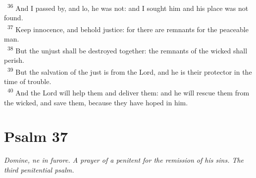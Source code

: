 \documentclass[a5paper,12pt]{article}
\begin{document}
\begin{multicols*}{2}
~\textsuperscript{36} And I passed by, and lo, he was not: and I sought him and his place was not found.\\
~\textsuperscript{37} Keep innocence, and behold justice: for there are remnants for the peaceable man.\\
~\textsuperscript{38} But the unjust shall be destroyed together: the remnants of the wicked shall perish.\\
~\textsuperscript{39} But the salvation of the just is from the Lord, and he is their protector in the time of trouble.\\
~\textsuperscript{40} And the Lord will help them and deliver them: and he will rescue them from the wicked, and save them, because they have hoped in him.\\

\section{Psalm 37}
\label{sec:orge299369}
\emph{Domine, ne in furore. A prayer of a penitent for the remission of his sins. The third penitential psalm.}\\


\end{multicols*}
\end{document}
